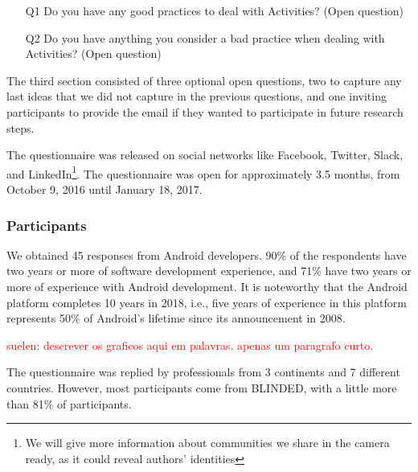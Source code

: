 \begin{itemize}
  \item[Q1] Do you have any good practices to deal with Activities? (Open question)
  \item[Q2] Do you have anything you consider a bad practice when dealing with Activities? (Open question)
\end{itemize}


The third section consisted of three optional open questions, 
two to capture any last ideas that we did not capture in the previous questions, and one inviting participants to provide the email if they wanted to participate in future research steps.


The questionnaire was released on social networks like Facebook, Twitter, Slack, and LinkedIn\footnote{We will give more information about communities we share in the camera ready, as it could reveal authors' identities}. The questionnaire was open for approximately 3.5 months, from October 9, 2016 until January 18, 2017.

\subsubsection{Participants}
\label{etapa-1-participantes}

We obtained 45 responses from Android developers. 
90\% of the respondents have two years or more of software development experience, 
and 71\% have two years or more of experience with Android development. 
It is noteworthy that the Android platform completes 10 years in 2018, i.e., 
five years of experience in this platform represents 50\% of Android's lifetime
since its announcement in 2008.

\textcolor{red}{suelen: descrever os graficos aqui em palavras. apenas um paragrafo curto.}

The questionnaire was replied by professionals from 3 continents and 7 different countries.
However, most participants come from BLINDED, with a little more than 81\% of participants.

